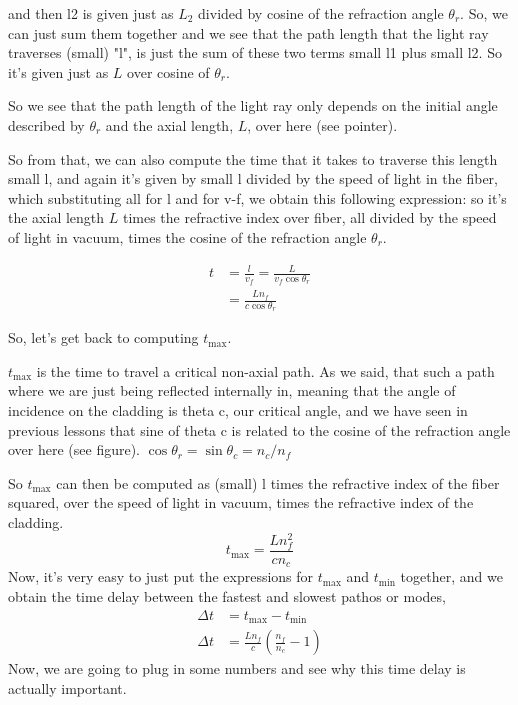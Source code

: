 and then l2 is given just as $L_2$ divided by cosine of the refraction angle $\theta_r$. So, we can just sum them together and we see that the path length that the light ray traverses (small) "l", is just the sum of these two terms small l1 plus small l2. So it's given just as $L$ over cosine of $\theta_r$.

So we see that the path length of the light ray only depends on the initial angle described by $\theta_r$ and the axial length, $L$, over here (see pointer).

So from that, we can also compute the time that it takes to traverse this length small l, and again it's given by small l divided by the speed of light in the fiber, which substituting all for l and for v-f, we obtain this following expression: so it's the axial length $L$ times the refractive index over fiber, all divided by the speed of light in vacuum, times the cosine of the refraction angle $\theta_r$.

\begin{equation}
\begin{aligned}
t &=\frac{l}{v_f}=\frac{L}{v_f \cos \theta_r} \\
&=\frac{L n_f}{c \cos \theta_r}
\end{aligned}
\end{equation}

So, let's get back to computing $t_{\mathrm{max}}$.

$t_{\mathrm{max}}$ is the time to travel a critical non-axial path. As we said, that such a path where we are just being reflected internally in, meaning that the angle of incidence on the cladding is theta c, our critical angle, and we have seen in previous lessons that sine of theta c is related to the cosine of the refraction angle over here (see figure). $\cos \theta_r=\sin \theta_c=n_c / n_f$

So $t_{\mathrm{max}}$ can then be computed as (small) l times the refractive index of the fiber squared, over the speed of light in vacuum, times the refractive index of the cladding. 
\begin{equation}
t_{\max }=\frac{L n_f^2}{c n_c}
\end{equation}
Now, it's very easy to just put the expressions for $t_{\mathrm{max}}$ and $t_{\mathrm{min}}$ together, and we obtain the time delay between the fastest and slowest pathos or modes, 
\begin{equation}
\begin{aligned}
\Delta t &=t_{\max }-t_{\min } \\
\Delta t &=\frac{L n_f}{c}\left(\frac{n_f}{n_c}-1\right)
\end{aligned}
\end{equation}
Now, we are going to plug in some numbers and see why this time delay is actually important.

